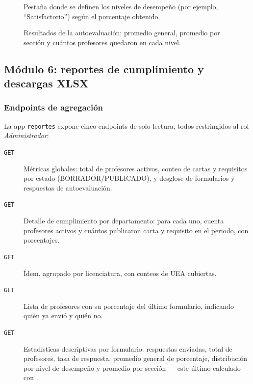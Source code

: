 \begin{figure}[!htbp]
    \centering
    \caption{Pestaña donde se definen los niveles de desempeño (por ejemplo, ``Satisfactorio'') según el porcentaje obtenido.}
    \label{fig:admin_niveles_desempeno}
\end{figure}

\begin{figure}[!htbp]
    \centering
    \caption{Resultados de la autoevaluación: promedio general, promedio por sección y cuántos profesores quedaron en cada nivel.}
    \label{fig:admin_estadisticas_autoeval}
\end{figure}

\subsection{Módulo 6: reportes de cumplimiento y descargas XLSX}\label{subsec:modulo6-reportes}

\subsubsection{Endpoints de agregación}

La app \texttt{reportes} expone cinco endpoints de solo lectura, todos restringidos al rol \emph{Administrador}:

\begin{description}
    \item[\texttt{GET} ] Métricas globales: total de profesores activos, conteo de cartas y requisitos por estado (BORRADOR/PUBLICADO), y desglose de formularios y respuestas de autoevaluación.
    \item[\texttt{GET} ] Detalle de cumplimiento por departamento: para cada uno, cuenta profesores activos y cuántos publicaron carta y requisito en el periodo, con porcentajes.
    \item[\texttt{GET} ] Ídem, agrupado por licenciatura, con conteos de UEA cubiertas.
    \item[\texttt{GET} ] Lista de profesores con su porcentaje del último formulario, indicando quién ya envió y quién no.
    \item[\texttt{GET} ] Estadísticas descriptivas por formulario: respuestas enviadas, total de profesores, tasa de respuesta, promedio general de porcentaje, distribución por nivel de desempeño y promedio por sección --- este último calculado con .
\end{description}

